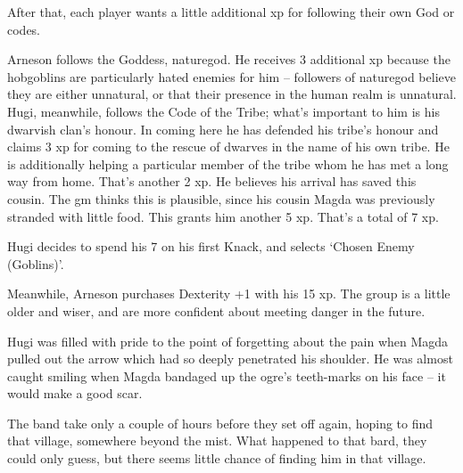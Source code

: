 \begin{exampletext}
After that, each player wants a little additional \gls{xp} for following their own God or codes.

Arneson follows the Goddess, \gls{naturegod}.
He receives 3 additional \gls{xp} because the hobgoblins are particularly hated enemies for him -- followers of \gls{naturegod} believe they are either unnatural, or that their presence in the human realm is unnatural.
Hugi, meanwhile, follows the Code of the Tribe; what's important to him is his dwarvish clan's honour.
In coming here he has defended his tribe's honour and claims 3 \gls{xp} for coming to the rescue of dwarves in the name of his own tribe.
He is additionally helping a particular member of the tribe whom he has met a long way from home.
That's another 2 \gls{xp}.
He believes his arrival has saved this cousin.
The \gls{gm} thinks this is plausible, since his cousin Magda was previously stranded with little food.
This grants him another 5 \gls{xp}.
That's a total of 7 \gls{xp}.

Hugi decides to spend his 7 on his first Knack, and selects `Chosen Enemy (Goblins)'.

Meanwhile, Arneson purchases Dexterity +1 with his 15 \gls{xp}.
The group is a little older and wiser, and are more confident about meeting danger in the future.

Hugi was filled with pride to the point of forgetting about the pain when Magda pulled out the arrow which had so deeply penetrated his shoulder.
He was almost caught smiling when Magda bandaged up the ogre's teeth-marks on his face -- it would make a good scar.

The band take only a couple of hours before they set off again, hoping to find that village, somewhere beyond the mist.
What happened to that bard, they could only guess, but there seems little chance of finding him in that village.

\end{exampletext}

